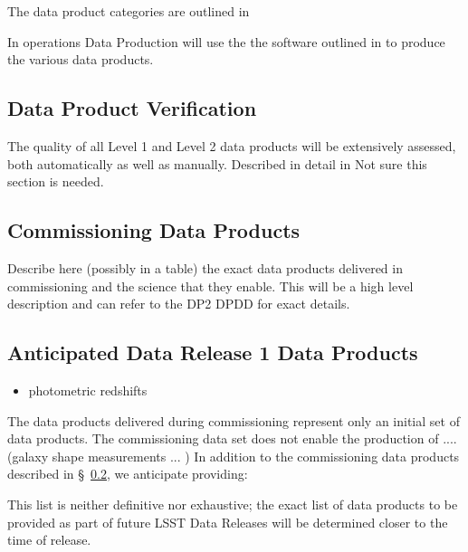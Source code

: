 The data product categories are outlined in \cite{lse-319}

In operations Data Production will use the the software outlined in  to produce the various data products.

\subsection{Data Product Verification}
The quality of all Level 1 and Level 2 data products will be extensively assessed, both automatically as well as manually. 
Described in detail in \cite{pstn-024}
Not sure this section is needed. 


\subsection{Commissioning Data Products}  \label{sec:dp-commissioning}
Describe here (possibly in a table) the exact data products delivered in commissioning and the science that they enable. 
This will be a high level description and can refer to the DP2 DPDD for exact details. 

\subsection{Anticipated Data Release 1 Data Products} \label{sec:dp-dr1}

\begin{itemize}
\item photometric redshifts
\end{itemize}


The data products delivered during commissioning represent only an initial set of data products. 
The commissioning data set does not enable the production of .... (galaxy shape measurements ... )
In addition to the commissioning data products described in \S~\ref{sec:dp-commissioning}, we anticipate providing: 

This list is neither definitive nor exhaustive; the exact list of data products to be provided as part of future LSST Data Releases will be determined closer to the time of release. 
